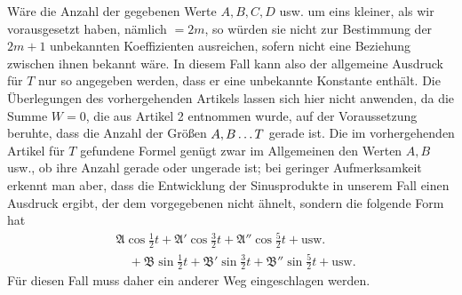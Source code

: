 
Wäre die Anzahl der gegebenen Werte $A,B,C,D$ usw. um eins kleiner, als
wir vorausgesetzt haben, nämlich $=2m$, so würden sie nicht zur Bestimmung der $2m+1$ unbekannten Koeffizienten ausreichen, sofern nicht eine Beziehung zwischen ihnen bekannt wäre. In diesem Fall kann also der allgemeine Ausdruck für $T$ nur so angegeben werden, dass er eine unbekannte Konstante enthält. Die Überlegungen des vorhergehenden Artikels lassen sich hier nicht anwenden, da die Summe $W=0$, die aus Artikel 2 entnommen wurde, auf der Voraussetzung beruhte, dass die Anzahl der
Größen $A,B\mathinner{.\,.\,.}T$ gerade ist. Die im vorhergehenden Artikel für $T$ gefundene Formel genügt zwar im Allgemeinen den Werten $A,B$ usw., ob ihre Anzahl gerade
oder ungerade ist; bei geringer Aufmerksamkeit erkennt man aber, dass die Entwicklung der Sinusprodukte
in unserem Fall einen Ausdruck ergibt, der dem vorgegebenen nicht ähnelt, sondern die folgende Form hat
\[
\begin{aligned}
&\mathfrak{A}\cos\tfrac12t+\mathfrak{A}'\cos\tfrac32t+\mathfrak{A}''\cos\tfrac52t+\text{usw.}\\
&\quad+\mathfrak{B}\sin\tfrac12t+\mathfrak{B}'\sin\tfrac32t+\mathfrak{B}''\sin\tfrac52t+\text{usw.}
\end{aligned}
\]
Für diesen Fall muss daher ein anderer Weg eingeschlagen werden.

